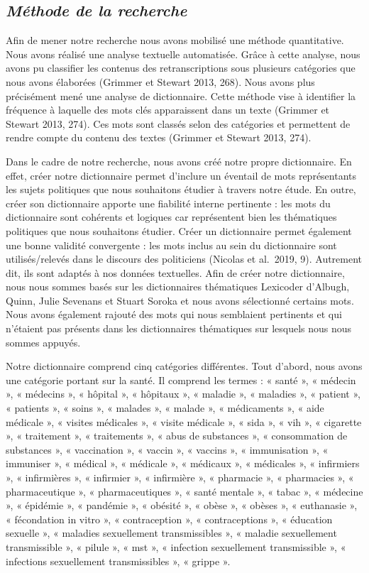 \documentclass[
  letterpaper,
  DIV=11,
  numbers=noendperiod]{scrartcl}
\begin{document}
\hypertarget{muxe9thode-de-la-recherche}{%
\subsection{\texorpdfstring{\emph{Méthode de la
recherche}}{Méthode de la recherche}}\label{muxe9thode-de-la-recherche}}

Afin de mener notre recherche nous avons mobilisé une méthode
quantitative. Nous avons réalisé une analyse textuelle automatisée.
Grâce à cette analyse, nous avons pu classifier les contenus des
retranscriptions sous plusieurs catégories que nous avons élaborées
(Grimmer et Stewart 2013, 268). Nous avons plus précisément mené une
analyse de dictionnaire. Cette méthode vise à identifier la fréquence à
laquelle des mots clés apparaissent dans un texte (Grimmer et Stewart
2013, 274). Ces mots sont classés selon des catégories et permettent de
rendre compte du contenu des textes (Grimmer et Stewart 2013, 274).

Dans le cadre de notre recherche, nous avons créé notre propre
dictionnaire. En effet, créer notre dictionnaire permet d'inclure un
éventail de mots représentants les sujets politiques que nous souhaitons
étudier à travers notre étude. En outre, créer son dictionnaire apporte
une fiabilité interne pertinente : les mots du dictionnaire sont
cohérents et logiques car représentent bien les thématiques politiques
que nous souhaitons étudier. Créer un dictionnaire permet également une
bonne validité convergente : les mots inclus au sein du dictionnaire
sont utilisés/relevés dans le discours des politiciens (Nicolas et
al.~2019, 9). Autrement dit, ils sont adaptés à nos données textuelles.
Afin de créer notre dictionnaire, nous nous sommes basés sur les
dictionnaires thématiques Lexicoder d'Albugh, Quinn, Julie Sevenans et
Stuart Soroka et nous avons sélectionné certains mots. Nous avons
également rajouté des mots qui nous semblaient pertinents et qui
n'étaient pas présents dans les dictionnaires thématiques sur lesquels
nous nous sommes appuyés.

Notre dictionnaire comprend cinq catégories différentes. Tout d'abord,
nous avons une catégorie portant sur la santé. Il comprend les termes :
« santé », « médecin », « médecins », « hôpital », « hôpitaux », «
maladie », « maladies », « patient », « patients », « soins », « malades
», « malade », « médicaments », « aide médicale », « visites médicales
», « visite médicale », « sida », « vih », « cigarette », « traitement
», « traitements », « abus de substances », « consommation de substances
», « vaccination », « vaccin », « vaccins », « immunisation », «
immuniser », « médical », « médicale », « médicaux », « médicales », «
infirmiers », « infirmières », « infirmier », « infirmière », «
pharmacie », « pharmacies », « pharmaceutique », « pharmaceutiques », «
santé mentale », « tabac », « médecine », « épidémie », « pandémie », «
obésité », « obèse », « obèses », « euthanasie », « fécondation in vitro
», « contraception », « contraceptions », « éducation sexuelle », «
maladies sexuellement transmissibles », « maladie sexuellement
transmissible », « pilule », « mst », « infection sexuellement
transmissible », « infections sexuellement transmissibles », « grippe ».
\end{document}
